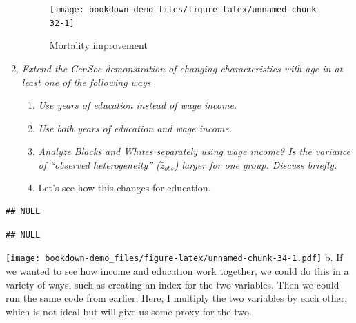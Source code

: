 \documentclass[]{book}
\begin{document}
\begin{enumerate}
  \begin{figure}
   \texttt{[image: bookdown-demo\_files/figure-latex/unnamed-chunk-32-1]} \caption{Mortality improvement}\label{fig:unnamed-chunk-32}
   \end{figure}
\item
  \emph{Extend the CenSoc demonstration of changing characteristics with age in at least one of the following ways}

  \begin{enumerate}
  \def\labelenumii{\alph{enumii}.}
  \item
    \emph{Use years of education instead of wage income.}\\
  \item
    \emph{Use both years of education and wage income.}\\
  \item
    \emph{Analyze Blacks and Whites separately using wage income? Is the variance of ``observed heterogeneity'' (\(\hat{z}_{obs}\)) larger for one group. Discuss briefly.}
  \item
    Let's see how this changes for education.
  \end{enumerate}
\end{enumerate}

\begin{verbatim}
## NULL
\end{verbatim}

\begin{verbatim}
## NULL
\end{verbatim}

\texttt{[image: bookdown-demo\_files/figure-latex/unnamed-chunk-34-1.pdf]}
b. If we wanted to see how income and education work together, we could do this in a variety of ways, such as creating an index for the two variables. Then we could run the same code from earlier. Here, I multiply the two variables by each other, which is not ideal but will give us some proxy for the two.
\end{document}
